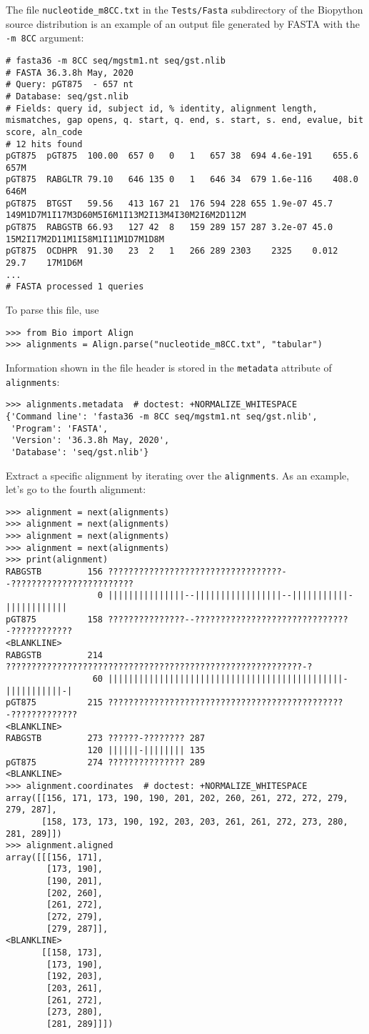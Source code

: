 The file \verb|nucleotide_m8CC.txt| in the \verb|Tests/Fasta| subdirectory of the Biopython source distribution is an example of an output file generated by FASTA with the \verb|-m 8CC| argument:
\begin{verbatim}
# fasta36 -m 8CC seq/mgstm1.nt seq/gst.nlib
# FASTA 36.3.8h May, 2020
# Query: pGT875  - 657 nt
# Database: seq/gst.nlib
# Fields: query id, subject id, % identity, alignment length, mismatches, gap opens, q. start, q. end, s. start, s. end, evalue, bit score, aln_code
# 12 hits found
pGT875	pGT875	100.00	657	0	0	1	657	38	694	4.6e-191	655.6	657M
pGT875	RABGLTR	79.10	646	135	0	1	646	34	679	1.6e-116	408.0	646M
pGT875	BTGST	59.56	413	167	21	176	594	228	655	1.9e-07	45.7	149M1D7M1I17M3D60M5I6M1I13M2I13M4I30M2I6M2D112M
pGT875	RABGSTB	66.93	127	42	8	159	289	157	287	3.2e-07	45.0	15M2I17M2D11M1I58M1I11M1D7M1D8M
pGT875	OCDHPR	91.30	23	2	1	266	289	2303	2325	0.012	29.7	17M1D6M
...
# FASTA processed 1 queries
\end{verbatim}
To parse this file, use
\begin{verbatim}
>>> from Bio import Align
>>> alignments = Align.parse("nucleotide_m8CC.txt", "tabular")
\end{verbatim}
Information shown in the file header is stored in the \verb|metadata| attribute of \verb|alignments|:
\begin{verbatim}
>>> alignments.metadata  # doctest: +NORMALIZE_WHITESPACE
{'Command line': 'fasta36 -m 8CC seq/mgstm1.nt seq/gst.nlib',
 'Program': 'FASTA',
 'Version': '36.3.8h May, 2020',
 'Database': 'seq/gst.nlib'}
\end{verbatim}
Extract a specific alignment by iterating over the \verb|alignments|. As an example, let's go to the fourth alignment:
\begin{verbatim}
>>> alignment = next(alignments)
>>> alignment = next(alignments)
>>> alignment = next(alignments)
>>> alignment = next(alignments)
>>> print(alignment)
RABGSTB         156 ??????????????????????????????????--????????????????????????
                  0 |||||||||||||||--|||||||||||||||||--|||||||||||-||||||||||||
pGT875          158 ???????????????--??????????????????????????????-????????????
<BLANKLINE>
RABGSTB         214 ??????????????????????????????????????????????????????????-?
                 60 ||||||||||||||||||||||||||||||||||||||||||||||-|||||||||||-|
pGT875          215 ??????????????????????????????????????????????-?????????????
<BLANKLINE>
RABGSTB         273 ??????-???????? 287
                120 ||||||-|||||||| 135
pGT875          274 ??????????????? 289
<BLANKLINE>
>>> alignment.coordinates  # doctest: +NORMALIZE_WHITESPACE
array([[156, 171, 173, 190, 190, 201, 202, 260, 261, 272, 272, 279, 279, 287],
       [158, 173, 173, 190, 192, 203, 203, 261, 261, 272, 273, 280, 281, 289]])
>>> alignment.aligned
array([[[156, 171],
        [173, 190],
        [190, 201],
        [202, 260],
        [261, 272],
        [272, 279],
        [279, 287]],
<BLANKLINE>
       [[158, 173],
        [173, 190],
        [192, 203],
        [203, 261],
        [261, 272],
        [273, 280],
        [281, 289]]])
\end{verbatim}
